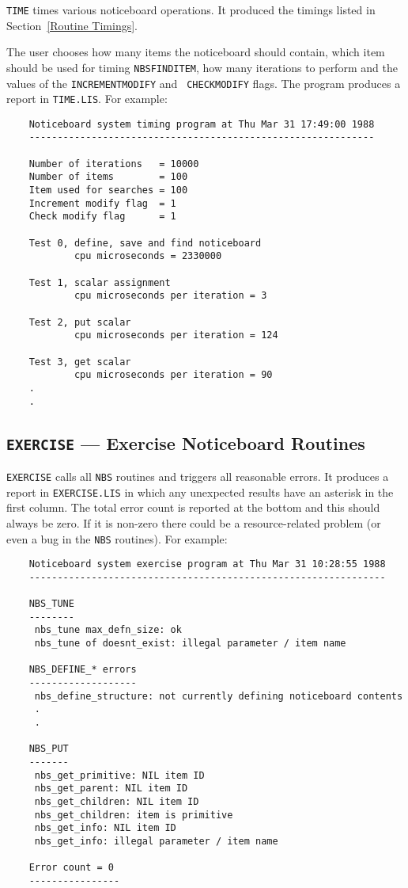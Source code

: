 \documentclass[twoside,11pt]{article}
\renewcommand{\_}{\texttt{\symbol{95}}}
\begin{document}
{\tt TIME} times various noticeboard operations. It produced the timings listed
in Section~\ref {Routine Timings}.

The user chooses how many items the noticeboard should contain, which item
should be used for timing {\tt NBS\_FIND\_ITEM}, how many iterations to perform
and the values of the {\tt INC\-RE\-MENT\_\-MOD\-IFY} and {\tt
CHECK\_\-MOD\-IFY} flags. The program produces a report in {\tt TIME.LIS}. For
example:

\begin {verbatim}
    Noticeboard system timing program at Thu Mar 31 17:49:00 1988
    -------------------------------------------------------------

    Number of iterations   = 10000
    Number of items        = 100
    Item used for searches = 100
    Increment modify flag  = 1
    Check modify flag      = 1

    Test 0, define, save and find noticeboard
            cpu microseconds = 2330000

    Test 1, scalar assignment
            cpu microseconds per iteration = 3

    Test 2, put scalar
            cpu microseconds per iteration = 124

    Test 3, get scalar
            cpu microseconds per iteration = 90
    .
    .
\end{verbatim}

\subsection {{\tt EXERCISE} --- Exercise Noticeboard Routines}

{\tt EXERCISE} calls all {\tt NBS} routines and triggers all reasonable
errors. It produces a report in {\tt EXERCISE.LIS} in which any unexpected
results have an asterisk in the first column. The total error count is reported
at the bottom and this should always be zero. If it is non-zero there could
be a resource-related problem (or even a bug in the {\tt NBS} routines).
For example:

\begin {verbatim}
    Noticeboard system exercise program at Thu Mar 31 10:28:55 1988
    ---------------------------------------------------------------

    NBS_TUNE
    --------
     nbs_tune max_defn_size: ok
     nbs_tune of doesnt_exist: illegal parameter / item name

    NBS_DEFINE_* errors
    -------------------
     nbs_define_structure: not currently defining noticeboard contents
     .
     .

    NBS_PUT
    -------
     nbs_get_primitive: NIL item ID
     nbs_get_parent: NIL item ID
     nbs_get_children: NIL item ID
     nbs_get_children: item is primitive
     nbs_get_info: NIL item ID
     nbs_get_info: illegal parameter / item name

    Error count = 0
    ----------------
\end{verbatim}
\end{document}

